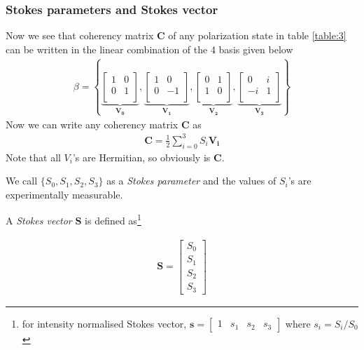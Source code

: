 \documentclass[11pt,a4paper]{article}
\numberwithin{equation}{section}
\begin{document}
\subsubsection{Stokes parameters and Stokes vector}
Now we see that coherency matrix $\boldsymbol{C}$ of any polarization state in table \ref{table:3} can be written in the linear combination of the 4 basis given below \cite{yt video}
\begin{align}
	\beta = \left\{
	\underbrace{\begin{bmatrix}1 & 0 \\ 0 & 1\\\end{bmatrix}}_{\boldsymbol{V_0}},
	\underbrace{\begin{bmatrix}1 & 0 \\ 0 & -1\\\end{bmatrix}}_{\boldsymbol{V_1}},
	\underbrace{\begin{bmatrix}0 & 1 \\ 1 & 0\\\end{bmatrix}}_{\boldsymbol{V_2}},
	\underbrace{\begin{bmatrix}0 & i \\ -i & 1\\\end{bmatrix}}_{\boldsymbol{V_3}}
	\right\}
\end{align}
Now we can write any coherency matrix $ \boldsymbol{C} $ as 
\begin{align}
\boldsymbol{C} = \frac{1}{2} \sum_{i=0}^{3} S_i \boldsymbol{V_i} \label{eq:1.12}
\end{align}
Note that all $V_i$'s are Hermitian, so obviously is $ \boldsymbol{C} $.

We call $\{S_0, S_1, S_2, S_3\}$ as a \textit{Stokes parameter} and the values of $S_i$'s are experimentally measurable.

A \textit{Stokes vector} $ \boldsymbol{S} $ is defined as\footnote{for intensity normalised Stokes vector, $\boldsymbol{s}= \begin{bmatrix} 1& s_1& s_2& s_3\end{bmatrix}$ where $s_i=S_i/S_0$}

\begin{align}
	\boldsymbol{S}= \begin{bmatrix} S_0\\ S_1\\ S_2\\S_3\end{bmatrix}
\end{align}
\end{document}
